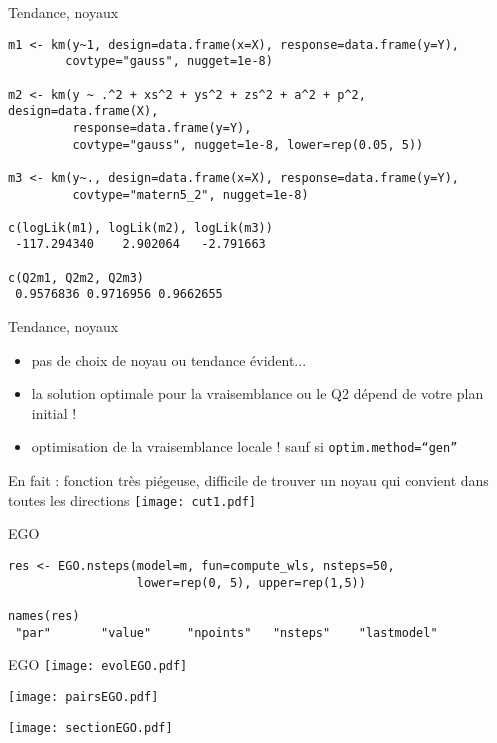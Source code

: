 \documentclass{beamer}
\begin{document}
\begin{frame}[fragile]{Tendance, noyaux}
\begin{Verbatim}[fontsize=\scriptsize]
m1 <- km(y~1, design=data.frame(x=X), response=data.frame(y=Y), 
        covtype="gauss", nugget=1e-8)

m2 <- km(y ~ .^2 + xs^2 + ys^2 + zs^2 + a^2 + p^2, design=data.frame(X), 
         response=data.frame(y=Y), 
         covtype="gauss", nugget=1e-8, lower=rep(0.05, 5))

m3 <- km(y~., design=data.frame(x=X), response=data.frame(y=Y), 
         covtype="matern5_2", nugget=1e-8)

c(logLik(m1), logLik(m2), logLik(m3))
 -117.294340    2.902064   -2.791663

c(Q2m1, Q2m2, Q2m3)
 0.9576836 0.9716956 0.9662655 
\end{Verbatim} 
 
\end{frame}      
\begin{frame}[fragile]{Tendance, noyaux}

\begin{itemize}
 \item pas de choix de noyau ou tendance évident...
 \item la solution optimale pour la vraisemblance ou le Q2 dépend de votre plan initial !
 \item optimisation de la vraisemblance locale ! sauf si \texttt{optim.method=``gen''}
\end{itemize}

\begin{alertblock}{En fait : fonction très piégeuse, difficile de trouver un noyau qui convient dans toutes les directions}
 \texttt{[image: cut1.pdf]} 
\end{alertblock}
\end{frame}
\begin{frame}[fragile]{EGO}
\begin{Verbatim}
res <- EGO.nsteps(model=m, fun=compute_wls, nsteps=50, 
                  lower=rep(0, 5), upper=rep(1,5))
                  
names(res)
 "par"       "value"     "npoints"   "nsteps"    "lastmodel"
\end{Verbatim} 
\end{frame}
\begin{frame}[fragile]{EGO}
\texttt{[image: evolEGO.pdf]} 
\end{frame}
\begin{frame}[fragile]{}
\texttt{[image: pairsEGO.pdf]} 
\end{frame}
\begin{frame}[fragile]{}
\texttt{[image: sectionEGO.pdf]} 
\end{frame}
\end{document}
